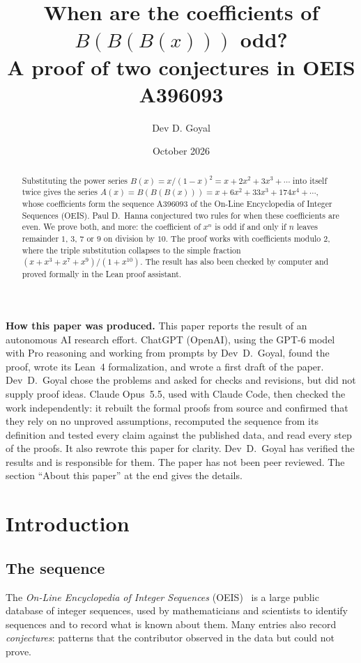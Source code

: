 \documentclass[11pt,a4paper]{article}
\title{When are the coefficients of $B(B(B(x)))$ odd?\\[6pt]\large A proof of two conjectures in OEIS A396093}
\author{Dev D. Goyal}
\date{October 2026}
\theoremstyle{definition}
\theoremstyle{remark}
\begin{document}
\maketitle
\begin{abstract}
Substituting the power series $B(x)=x/(1-x)^2=x+2x^2+3x^3+\cdots$ into itself twice gives the series
$A(x)=B(B(B(x)))=x+6x^2+33x^3+174x^4+\cdots$, whose coefficients form the sequence A396093 of the On-Line Encyclopedia
of Integer Sequences (OEIS). Paul D.~Hanna conjectured two rules for when these coefficients are even. We prove both,
and more: the coefficient of $x^n$ is odd if and only if $n$ leaves remainder $1$, $3$, $7$ or $9$ on division by $10$.
The proof works with coefficients modulo $2$, where the triple substitution collapses to the simple fraction
$(x+x^3+x^7+x^9)/(1+x^{10})$. The result has also been checked by computer and proved formally in the Lean proof
assistant.
\end{abstract}
\begin{center}\begin{minipage}{0.88\linewidth}\small
\textbf{How this paper was produced.} This paper reports the result of an autonomous AI research effort.
ChatGPT (OpenAI), using the GPT-6 model with Pro reasoning and working from prompts by Dev~D.~Goyal, found the proof, wrote its Lean~4 formalization, and wrote a first draft of the paper.
Dev~D.~Goyal chose the problems and asked for checks and revisions, but did not supply proof ideas.
Claude Opus~5.5, used with Claude Code, then checked the work independently: it rebuilt the formal proofs from
source and confirmed that they rely on no unproved assumptions, recomputed the sequence from its definition and tested
every claim against the published data, and read every step of the proofs. It also rewrote this paper for clarity.
Dev~D.~Goyal has verified the results and is responsible for them. The paper has not been peer reviewed.
The section ``About this paper'' at the end gives the details.
\end{minipage}\end{center}

\section{Introduction}

\subsection{The sequence}\label{sec:sequence}
The \emph{On-Line Encyclopedia of Integer Sequences} (OEIS)~\cite{oeisdb} is a large public database of integer
sequences, used by mathematicians and scientists to identify sequences and to record what is known about them. Many
entries also record \emph{conjectures}: patterns that the contributor observed in the data but could not prove.
\end{document}
